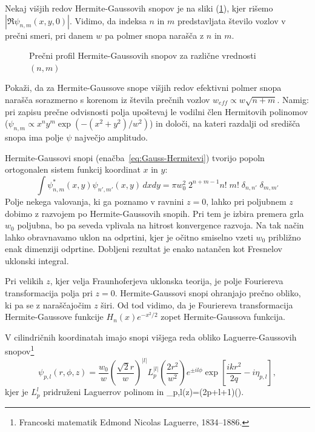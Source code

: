 Nekaj višjih redov Hermite-Gaussovih snopov je na sliki (\ref{fig:Gauss-Hermitevi-snopi}),
kjer rišemo $|\Re\psi_{n,m}(x, y, 0)|$.
Vidimo, da indeksa $n$ in $m$ predstavljata število vozlov v prečni smeri,
pri danem $w$ pa polmer snopa narašča z $n$ in $m$. 

\begin{figure}[h]
\centering
\def\svgwidth{110truemm} 

\caption{Prečni profil Hermite-Gaussovih snopov za različne vrednosti $(n,m)$}
\label{fig:Gauss-Hermitevi-snopi}
\end{figure}

\begin{definition}
\label{naloga:HG}
Pokaži, da za Hermite-Gaussove snope višjih redov efektivni polmer snopa 
narašča sorazmerno s korenom iz števila prečnih vozlov $ w_{eff}\propto w\sqrt{n+m}$.
Namig: pri zapisu prečne odvisnosti polja upoštevaj le vodilni člen
 Hermitovih polinomov ($\psi_{n,m}\propto x^{n}y^{m}\exp(-(x^{2}+y^{2})/w^{2})$)
 in določi, na kateri razdalji od središča snopa ima polje $\psi$
največjo amplitudo.
\end{definition}

Hermite-Gaussovi snopi (enačba~\ref{eq:Gauss-Hermitevi}) tvorijo popoln
ortogonalen sistem funkcij koordinat $x$ in $y$:
\begin{equation}
\int\psi_{n,m}^{*}(x,y)\psi_{n',m'}(x,y)\, dx dy=\pi w_{0}^{2}\; 
2^{n+m-1}n!\;m!\; \delta_{n,n'}\;\delta_{m,m'}
\end{equation}
Polje nekega valovanja, ki ga poznamo v ravnini $z=0$, lahko pri
poljubnem $z$ dobimo z razvojem po Hermite-Gaussovih snopih. Pri tem
je izbira premera grla $w_{0}$ poljubna, bo pa seveda vplivala na
hitrost konvergence razvoja. Na tak način lahko obravnavamo uklon
na odprtini, kjer je očitno smiselno vzeti $w_{0}$ približno enak
dimenziji odprtine. Dobljeni rezultat je enako natančen kot Fresnelov
uklonski integral.

Pri velikih $z$, kjer velja Fraunhoferjeva uklonska teorija, je
polje Fouriereva transformacija polja pri $z=0$. Hermite-Gaussovi
snopi ohranjajo prečno obliko, ki pa se z naraščajočim $z$ širi. 
Od tod vidimo, da je Fouriereva transformacija Hermite-Gaussove funkcije 
$H_{n}(x)e^{-x^{2}/2}$ zopet Hermite-Gaussova funkcija.

V cilindričnih koordinatah imajo snopi višjega reda obliko Laguerre-Gaussovih 
snopov\footnote{Francoski matematik Edmond Nicolas Laguerre, 1834--1886.}
\begin{equation}
\psi_{p,l}(r,\phi,z)=\frac{w_{0}}{w}\left(\frac{\sqrt{2}r}{w}\right)^{|l|}
L_{p}^{|l|}\left(\frac{2r^{2}}{w^{2}}\right)e^{\pm il\phi}\exp\left[\frac{ikr^{2}}{2q}-i\eta_{p,l}\right],
\label{eq:Gauss-Laguerrevi}
\end{equation}
kjer je $L_{p}^{l}$ pridruženi Laguerrov polinom in 
\beq
\eta_{p,l}\left(z\right)=(2p+l+1)\arctan\left(\right).
\label{eq:etaGL}
\eeq

